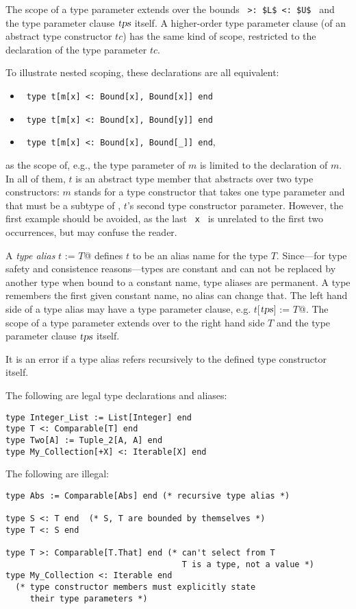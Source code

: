 The scope of a type parameter extends over the bounds ~\lstinline!>: $L$ <: $U$!~ and the type parameter clause $\mbox{\sl tps}$ itself. A higher-order type parameter clause (of an abstract type constructor $tc$) has the same kind of scope, restricted to the declaration of the type parameter $tc$. 

To illustrate nested scoping, these declarations are all equivalent: 
\begin{itemize}
  \item[] ~\lstinline!type t[m[x] <: Bound[x], Bound[x]] end! 

  \item[] ~\lstinline!type t[m[x] <: Bound[x], Bound[y]] end!

  \item[] ~\lstinline!type t[m[x] <: Bound[x], Bound[_]] end!,
\end{itemize} 
as the scope of, e.g., the type parameter of $m$ is limited to the declaration of $m$. In all of them, $t$ is an abstract type member that abstracts over two type constructors: $m$ stands for a type constructor that takes one type parameter and that must be a subtype of , $t$'s second type constructor parameter. However, the first example should be avoided, as the last ~\lstinline!x!~ is unrelated to the first two occurrences, but may confuse the reader. 

A {\em type alias} \lstinline@type $t$ := $T$@ defines $t$ to be an alias name for the type $T$. Since---for type safety and consistence reasons---types are constant and can not be replaced by another type when bound to a constant name, type aliases are permanent. A type remembers the first given constant name, no alias can change that. The left hand side of a type alias may have a type parameter clause, e.g. \lstinline@type $t$[$\mbox{\sl tps}$] := $T$@. The scope of a type parameter extends over to the right hand side $T$ and the type parameter clause $\mbox{\sl tps}$ itself. 

It is an error if a type alias refers recursively to the defined type constructor itself. 

\example The following are legal type declarations and aliases:
\begin{lstlisting}
type Integer_List := List[Integer] end
type T <: Comparable[T] end
type Two[A] := Tuple_2[A, A] end
type My_Collection[+X] <: Iterable[X] end
\end{lstlisting}
The following are illegal:
\begin{lstlisting}
type Abs := Comparable[Abs] end (* recursive type alias *)

type S <: T end  (* S, T are bounded by themselves *)
type T <: S end

type T >: Comparable[T.That] end (* can't select from T
                                    T is a type, not a value *)
type My_Collection <: Iterable end
  (* type constructor members must explicitly state
     their type parameters *)
\end{lstlisting}





